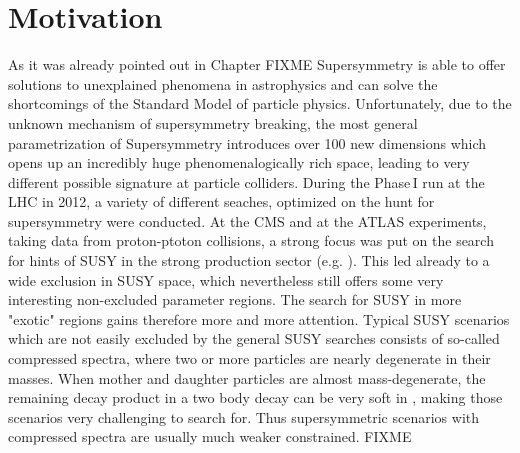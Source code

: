 \chapter{Motivation}
\label{sec:Motivation}
As it was already pointed out in Chapter FIXME %
 Supersymmetry is able to offer solutions to unexplained phenomena in astrophysics and can solve the shortcomings of the Standard Model of particle physics.
Unfortunately, due to the unknown mechanism of supersymmetry breaking, the most general parametrization of Supersymmetry introduces over 100 new dimensions which opens up an incredibly huge phenomenalogically rich space, 
leading to very different possible signature at particle colliders. 
During the Phase\,I run at the LHC in 2012, a variety of different seaches, optimized on the hunt for supersymmetry were conducted.
At the CMS and at the ATLAS experiments, taking data from proton-ptoton collisions, a strong focus was put on the search for hints of SUSY in the strong production sector (e.g. \cite{bib:CMS:RA2_8TeV,bib:CMS:MT2_8TeV,bib:ATLAS:JetPlusMET_8TeV}).
This led already to a wide exclusion in SUSY space, which nevertheless still offers some very interesting non-excluded parameter regions.
The search for SUSY in more "exotic" regions gains therefore more and more attention. 
Typical SUSY scenarios which are not easily excluded by the general SUSY searches consists of so-called compressed spectra, where two or more particles are nearly degenerate in their masses.
When mother and daughter particles are almost mass-degenerate, the remaining decay product in a two body decay can be very soft in \pt, making those scenarios very challenging to search for.
Thus supersymmetric scenarios with compressed spectra are usually much weaker constrained.
FIXME %

